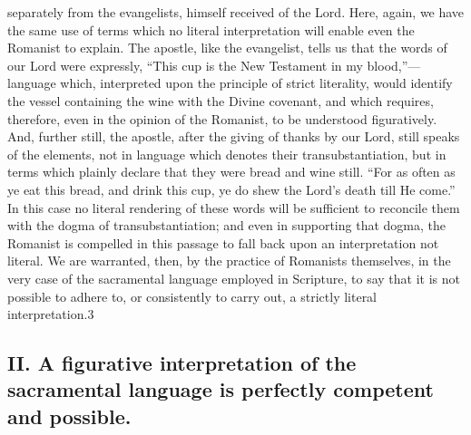 \documentclass[]{book}
\begin{document}
separately from the evangelists, himself received of the Lord. Here, again, we have the same use of terms which no literal interpretation will enable even the Romanist to explain. The apostle, like the evangelist, tells us that the words of our Lord were expressly, ``This cup is the New Testament in my blood,''---language which, interpreted upon the principle of strict literality, would identify the vessel containing the wine with the Divine covenant, and which requires, therefore, even in the opinion of the Romanist, to be understood figuratively. And, further still, the apostle, after the giving of thanks by our Lord, still speaks of the elements, not in language which denotes their transubstantiation, but in terms which plainly declare that they were bread and wine still. ``For as often as ye eat this bread, and drink this cup, ye do shew the Lord's death till He come.'' In this case no literal rendering of these words will be sufficient to reconcile them with the dogma of transubstantiation; and even in supporting that dogma, the Romanist is compelled in this passage to fall back upon an interpretation not literal. We are warranted, then, by the practice of Romanists themselves, in the very case of the sacramental language employed in Scripture, to say that it is not possible to adhere to, or consistently to carry out, a strictly literal interpretation.3

\hypertarget{ii.-a-figurative-interpretation-of-the-sacramental-language-is-perfectly-competent-and-possible.}{%
\subsection{II. A figurative interpretation of the sacramental language is perfectly competent and possible.}\label{ii.-a-figurative-interpretation-of-the-sacramental-language-is-perfectly-competent-and-possible.}}
\end{document}
